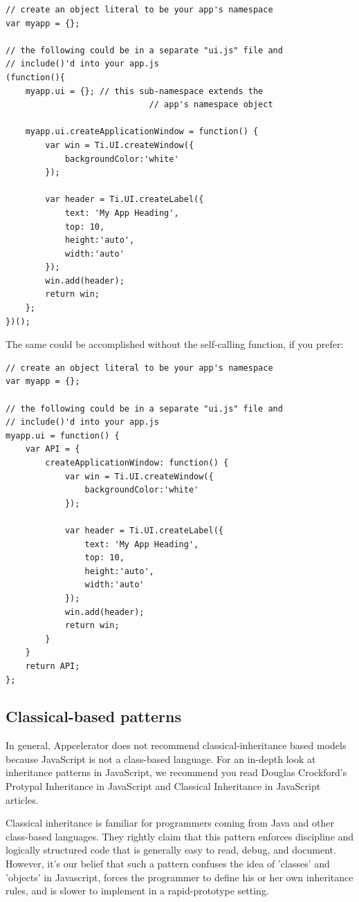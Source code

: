 \documentclass[11pt]{book}
\begin{document}
\begin{lstlisting}[frame=single]
// create an object literal to be your app's namespace
var myapp = {};

// the following could be in a separate "ui.js" file and
// include()'d into your app.js
(function(){
    myapp.ui = {}; // this sub-namespace extends the
                             // app's namespace object

    myapp.ui.createApplicationWindow = function() {
        var win = Ti.UI.createWindow({
            backgroundColor:'white'
        });

        var header = Ti.UI.createLabel({
            text: 'My App Heading',
            top: 10,
            height:'auto',
            width:'auto'
        });
        win.add(header);
        return win;
    };
})();
\end{lstlisting}

The same could be accomplished without the self-calling function, if you prefer:
\begin{lstlisting}[frame=single]
// create an object literal to be your app's namespace
var myapp = {};

// the following could be in a separate "ui.js" file and
// include()'d into your app.js
myapp.ui = function() {
    var API = {
        createApplicationWindow: function() {
            var win = Ti.UI.createWindow({
                backgroundColor:'white'
            });

            var header = Ti.UI.createLabel({
                text: 'My App Heading',
                top: 10,
                height:'auto',
                width:'auto'
            });
            win.add(header);
            return win;
        }
    }
    return API;
};
\end{lstlisting}

\subsection{Classical-based patterns}
In general, Appcelerator does not recommend classical-inheritance based models because JavaScript is not a class-based language. For an in-depth look at inheritance patterns in JavaScript, we recommend you read Douglas Crockford's Protypal Inheritance in JavaScript and Classical Inheritance in JavaScript articles.

Classical inheritance is familiar for programmers coming from Java and other class-based languages. They rightly claim that this pattern enforces discipline and logically structured code that is generally easy to read, debug, and document. However, it's our belief that such a pattern confuses the idea of 'classes' and 'objects' in Javascript, forces the programmer to define his or her own inheritance rules, and is slower to implement in a rapid-prototype setting.
\end{document}
